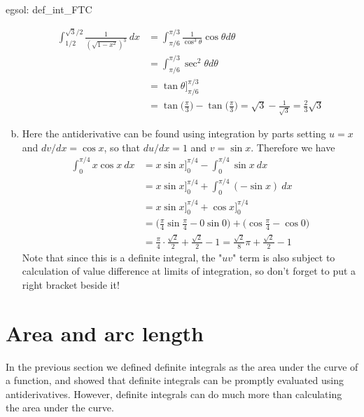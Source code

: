 \begin{egsol}[]{egsol: def_int_FTC}
\begin{enumerate}[a)]
        \begin{align*}
            \int_{1/2}^{\sqrt{3}/2} \frac{1}{(\sqrt{1-x^2})^3}~dx &= \int_{\pi/6}^{\pi/3} \frac{1}{\cos^3 \theta}\cos \theta d\theta\\
            &= \int_{\pi/6}^{\pi/3} \sec^2 \theta d\theta\\
            &= \tan \theta \Big]_{\pi/6}^{\pi/3}\\
            &= \tan\Big(\frac{\pi}{3}\Big) - \tan\Big(\frac{\pi}{3}\Big) = \sqrt{3} - \frac{1}{\sqrt{3}} = \frac{2}{3}\sqrt{3}
        \end{align*}
        \item Here the antiderivative can be found using integration by parts setting $u = x$ and $dv/dx = \cos x$, so that $du/dx = 1$ and $v = \sin x$.  Therefore we have
        \begin{align*}
            \int_{0}^{\pi/4} x \cos x~dx &= x \sin x \Big]_{0}^{\pi/4} - \int_{0}^{\pi/4} \sin x~dx\\
            &= x \sin x \Big]_{0}^{\pi/4} + \int_{0}^{\pi/4} (-\sin x)~dx\\
            &= x \sin x \Big]_{0}^{\pi/4} + \cos x \Big]_{0}^{\pi/4}\\
            &= \Big(\frac{\pi}{4} \sin \frac{\pi}{4} - 0 \sin 0\Big) + \Big(\cos \frac{\pi}{4} - \cos 0 \Big)\\
            &= \frac{\pi}{4} \cdot \frac{\sqrt{2}}{2} + \frac{\sqrt{2}}{2} - 1 = \frac{\sqrt{2}}{8}\pi + \frac{\sqrt{2}}{2}- 1
        \end{align*}
        Note that since this is a definite integral, the "$uv$" term is also subject to calculation of value difference at limits of integration, so don't forget to put a right bracket beside it!
    \end{enumerate}
\end{egsol}

\section{Area and arc length}

In the previous section we defined definite integrals as the area under the curve of a function, and showed that definite integrals can be promptly evaluated using antiderivatives.  However, definite integrals can do much more than calculating the area under the curve.  

